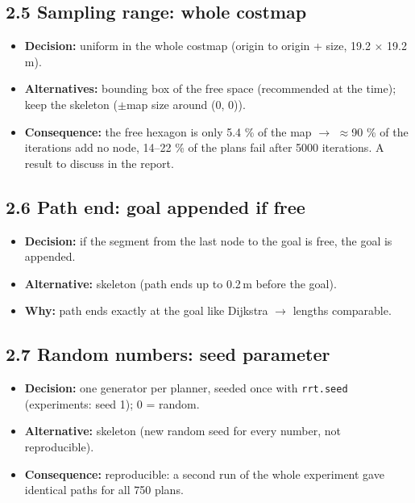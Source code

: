 \documentclass[10pt]{article}
\newcommand{\pkg}[1]{\texttt{#1}}
\begin{document}
\subsection*{2.5 Sampling range: whole costmap}
\begin{itemize}
  \item \textbf{Decision:} uniform in the whole costmap (origin to origin + size, 19.2 $\times$ 19.2\,m).
  \item \textbf{Alternatives:} bounding box of the free space (recommended at the time); keep the skeleton ($\pm$map size around (0, 0)).
  \item \textbf{Consequence:} the free hexagon is only 5.4 \% of the map $\rightarrow$ $\approx$90 \% of the iterations add no node, 14--22 \% of the plans fail after 5000 iterations. A result to discuss in the report.
\end{itemize}

\subsection*{2.6 Path end: goal appended if free}
\begin{itemize}
  \item \textbf{Decision:} if the segment from the last node to the goal is free, the goal is appended.
  \item \textbf{Alternative:} skeleton (path ends up to 0.2\,m before the goal).
  \item \textbf{Why:} path ends exactly at the goal like Dijkstra $\rightarrow$ lengths comparable.
\end{itemize}

\subsection*{2.7 Random numbers: seed parameter}
\begin{itemize}
  \item \textbf{Decision:} one generator per planner, seeded once with \pkg{rrt.seed} (experiments: seed 1); 0 = random.
  \item \textbf{Alternative:} skeleton (new random seed for every number, not reproducible).
  \item \textbf{Consequence:} reproducible: a second run of the whole experiment gave identical paths for all 750 plans.
\end{itemize}
\end{document}
